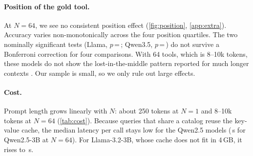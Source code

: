 \paragraph{Position of the gold tool.}
At $N{=}64$, we see no consistent position effect (\cref{fig:position}, \cref{app:extra}). Accuracy varies non-monotonically across the four position quartiles. The two nominally significant tests (Llama, $p$\,=\,\PosPLlama; Qwen3.5, $p$\,=\,\PosPQwenThreeFive) do not survive a Bonferroni correction for four comparisons. With 64 tools, which is 8--10k tokens, these models do not show the lost-in-the-middle pattern reported for much longer contexts \citep{liu2024lost, kate2025longfunceval}. Our sample is small, so we only rule out large effects.

\paragraph{Cost.}
Prompt length grows linearly with $N$: about 250 tokens at $N{=}1$ and 8--10k tokens at $N{=}64$ (\cref{tab:cost}). Because queries that share a catalog reuse the key-value cache, the median latency per call stays low for the Qwen2.5 models (\LatQwenThreeNSixtyFour\,s for Qwen2.5-3B at $N{=}64$). For Llama-3.2-3B, whose cache does not fit in 4\,GB, it rises to \LatLlamaNSixtyFour\,s.
